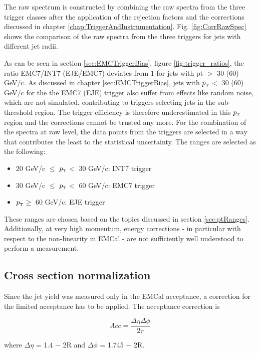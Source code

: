 \documentclass[ALICE]{ALICE_analysis_notes}
\newcommand{\pT}{$p_{\mbox{\tiny T}}$\xspace}
\begin{document}
The raw spectrum is constructed by combining the raw spectra from the three trigger classes after the application of the rejection factors and the corrections discussed in chapter \ref{chap:TriggerAndInstrumentation}. Fig. \ref{fig:CorrRawSpec} shows the comparison of the raw spectra from the three triggers for jets with different jet radii. 

As can be seen in section \ref{sec:EMCTriggerBias}, figure \ref{fig:trigger_ratios}, the ratio EMC7/INT7 (EJE/EMC7) deviates from 1 for jets with pt $>$ 30 (60) GeV/c. As discussed in chapter \ref{sec:EMCTriggerBias}, jets with \pT $<$ 30 (60) GeV/c for the the EMC7 (EJE) trigger also suffer from effects like random noise, which are not simulated, contributing to triggers selecting jets in the sub-threshold region. The trigger efficiency is therefore underestimated in this \pT region and the corrections cannot be trusted any more. For the combination of the spectra at raw level, the data points from the triggers are selected in a way that contributes the least to the statistical uncertainty. The ranges are selected as the following:

\begin{itemize}
    \item 20 GeV/c $\le$ \pT $<$ 30 GeV/c: INT7 trigger
    \item 30 GeV/c $\le$ \pT $<$ 60 GeV/c: EMC7 trigger
    \item \pT $\ge$ 60 GeV/c: EJE trigger
\end{itemize}

These ranges are chosen based on the topics discussed in section \ref{sec:ptRanges}. Additionally, at very high momentum, energy corrections - in particular with respect to the non-linearity in EMCal - are not sufficiently well understood to perform a measurement.

\subsection{Cross section normalization}
\label{sec:xsecNomalization}

Since the jet yield was measured only in the EMCal acceptance, a correction for the limited acceptance has to be applied. The acceptance correction is

\begin{equation}
    Acc = \frac{\Delta\eta \Delta\phi}{2\pi}
\end{equation}

where $\Delta\eta$ = 1.4 − 2R and $\Delta\phi$ = 1.745 − 2R. 
\end{document}
